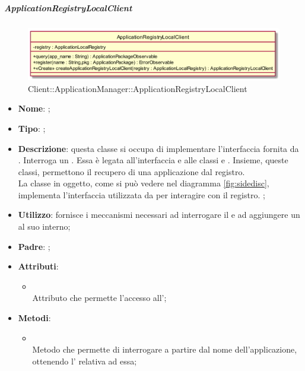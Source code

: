 \hypertarget{ApplicationRegistryLocalClient_label}{\subparagraph{ApplicationRegistryLocalClient}}
\begin{figure}[h]
	\centering
	\includegraphics[width=\textwidth,height=\textheight,keepaspectratio]{images/ClassApplicationRegistryLocalClient.png}
	\caption{Client::ApplicationManager::ApplicationRegistryLocalClient}
\end{figure}
\begin{itemize}
	\item \textbf{Nome}: ;
	\item \textbf{Tipo}: ;
	\item \textbf{Descrizione}: questa classe si occupa di implementare l'interfaccia fornita da \\ . Interroga un .
Essa è legata all'interfaccia  e alle classi  e . Insieme, queste classi, permettono il recupero di una applicazione dal registro. \\
La classe in oggetto, come si può vedere nel diagramma \ref{fig:sidedisc}, implementa l'interfaccia utilizzata da  per interagire con il registro.
;
	\item \textbf{Utilizzo}: fornisce i meccanismi necessari ad interrogare il  e ad aggiungere un  al suo interno;
	\item \textbf{Padre}: ;
	\item \textbf{Attributi}:
	\begin{itemize}
		\item[]  \\
		Attributo che permette l'accesso all';
	\end{itemize}
	\item \textbf{Metodi}:
	\begin{itemize}
		\item[]  \\		Metodo che permette di interrogare  a partire dal nome dell'applicazione, ottenendo l' relativa ad essa;\\

\end{itemize}
\end{itemize}

